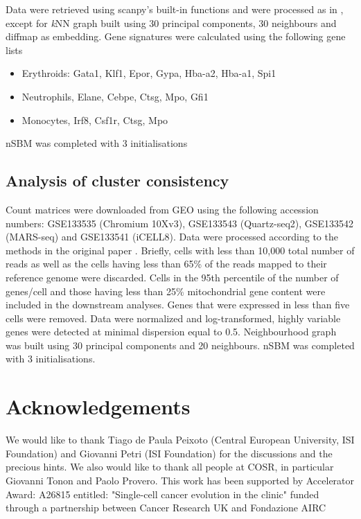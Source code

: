 \documentclass[10pt]{article}
\begin{document}
Data were retrieved using scanpy's built-in functions and were processed as in \cite{wolf_2019}, except for \emph{k}NN graph built using 30 principal components, 30 neighbours and diffmap as embedding. Gene signatures were calculated using the following gene lists
\begin{itemize}
\item Erythroids: Gata1, Klf1, Epor, Gypa, Hba-a2, Hba-a1, Spi1
\item Neutrophils, Elane, Cebpe, Ctsg, Mpo, Gfi1
\item Monocytes, Irf8, Csf1r, Ctsg, Mpo
\end{itemize}

nSBM was completed with 3 initialisations

\subsection*{Analysis of cluster consistency}

Count matrices were downloaded from GEO using the following accession numbers: GSE133535 (Chromium 10Xv3), GSE133543 (Quartz-seq2), GSE133542 (MARS-seq) and GSE133541 (iCELL8). Data were processed according to the methods in the original paper \cite{mereu_2020}. Briefly, cells with less than 10,000 total number of reads as well as the cells having less than 65\% of the reads mapped to their reference genome were discarded. Cells in the 95th percentile of the number of genes/cell and those having less than 25\% mitochondrial gene content were included in the downstream analyses. Genes that were expressed in less than five cells were removed. Data were normalized and log-transformed, highly variable genes were detected at minimal dispersion equal to 0.5. Neighbourhood graph was built using 30 principal components and 20 neighbours. nSBM was completed with 3 initialisations. 


\section*{Acknowledgements}

We would like to thank Tiago de Paula Peixoto (Central European University, ISI Foundation) and Giovanni Petri (ISI Foundation) for the discussions and the precious hints. We also would like to thank all people at COSR, in particular Giovanni Tonon and Paolo Provero.
This work has been supported by Accelerator Award: A26815 entitled:  "Single-cell cancer evolution in the clinic" funded through a partnership between Cancer Research UK and Fondazione AIRC





\end{document}

